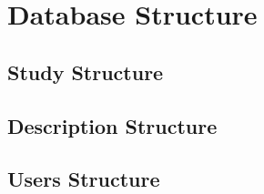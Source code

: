\section{Database Structure}


\subsection{Study Structure}
\subsection{Description Structure}


\subsection{Users Structure}